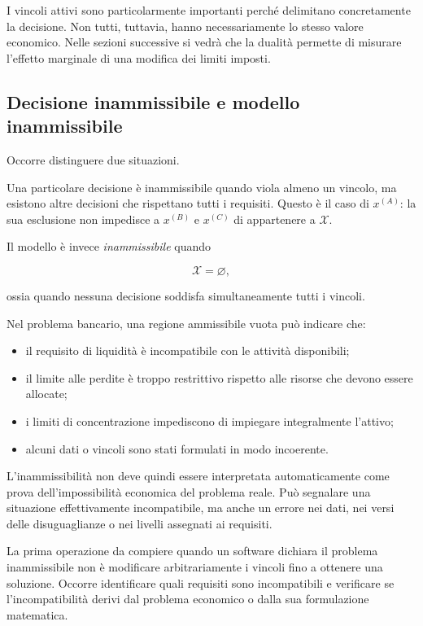 I vincoli attivi sono particolarmente importanti perch\'e delimitano
concretamente la decisione. Non tutti, tuttavia, hanno necessariamente lo
stesso valore economico. Nelle sezioni successive si vedr\`a che la dualit\`a
permette di misurare l'effetto marginale di una modifica dei limiti imposti.

\subsection{Decisione inammissibile e modello inammissibile}

Occorre distinguere due situazioni.

Una particolare decisione \`e inammissibile quando viola almeno un vincolo,
ma esistono altre decisioni che rispettano tutti i requisiti. Questo \`e il
caso di \(x^{(A)}\): la sua esclusione non impedisce a \(x^{(B)}\) e
\(x^{(C)}\) di appartenere a \(\mathcal{X}\).

Il modello \`e invece \emph{inammissibile} quando

\[
\mathcal{X}=\varnothing,
\]

\noindent ossia quando nessuna decisione soddisfa simultaneamente tutti i vincoli.

Nel problema bancario, una regione ammissibile vuota pu\`o indicare che:

\begin{itemize}

\item il requisito di liquidit\`a \`e incompatibile con le attivit\`a
disponibili;

\item il limite alle perdite \`e troppo restrittivo rispetto alle risorse che
devono essere allocate;

\item i limiti di concentrazione impediscono di impiegare integralmente
l'attivo;

\item alcuni dati o vincoli sono stati formulati in modo incoerente.

\end{itemize}

L'inammissibilit\`a non deve quindi essere interpretata automaticamente come
prova dell'impossibilit\`a economica del problema reale. Pu\`o segnalare una
situazione effettivamente incompatibile, ma anche un errore nei dati, nei versi
delle disuguaglianze o nei livelli assegnati ai requisiti.

\begin{remark}

La prima operazione da compiere quando un software dichiara il problema
inammissibile non \`e modificare arbitrariamente i vincoli fino a ottenere una
soluzione. Occorre identificare quali requisiti sono incompatibili e
verificare se l'incompatibilit\`a derivi dal problema economico o dalla sua
formulazione matematica.

\end{remark}

